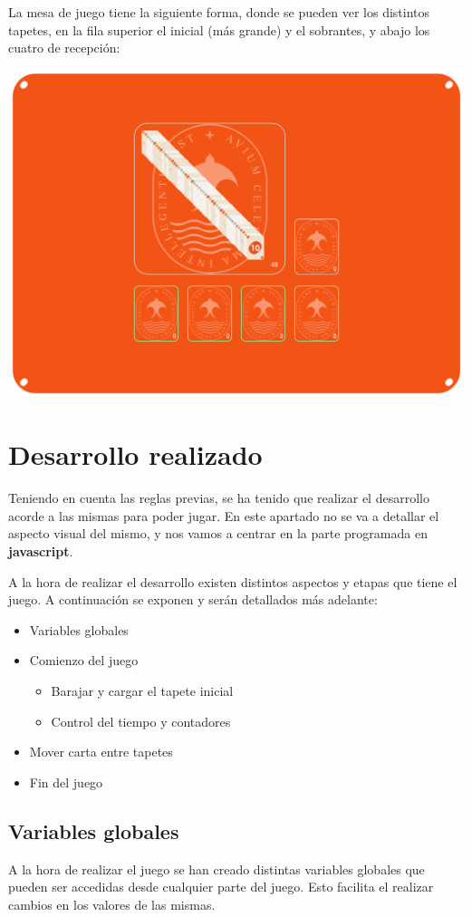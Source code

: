 \documentclass{\ClassPath/viu-tfm-template}
\begin{document}
La mesa de juego tiene la siguiente forma, donde se pueden ver los distintos tapetes, en la fila superior el inicial (más grande) y el sobrantes, y abajo los cuatro de recepción:
\begin{center}
    \includegraphics[width=0.7\linewidth]{img/mesa.png}
\end{center}


\chapter{Desarrollo realizado}

Teniendo en cuenta las reglas previas, se ha tenido que realizar el desarrollo acorde a las mismas para poder jugar. En este apartado no se va a detallar el aspecto visual del mismo, y nos vamos a centrar en la parte programada en \textbf{javascript}.

A la hora de realizar el desarrollo existen distintos aspectos y etapas que tiene el juego. A continuación se exponen y serán detallados más adelante:

\begin{itemize}
    \item Variables globales
    \item Comienzo del juego
    \begin{itemize}
        \item Barajar y cargar el tapete inicial
        \item Control del tiempo y contadores
    \end{itemize}
    \item Mover carta entre tapetes
    \item Fin del juego
\end{itemize}
\vspace{-1em}


\section{Variables globales}
A la hora de realizar el juego se han creado distintas variables globales que pueden ser accedidas desde cualquier parte del juego. Esto facilita el realizar cambios en los valores de las mismas.
\end{document}
